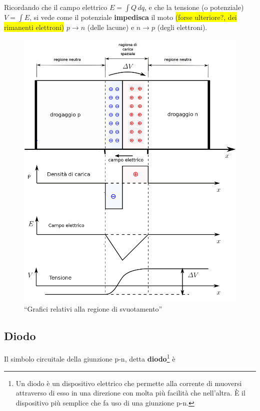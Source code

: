 \documentclass[
]{book}
\begin{document}
Ricordando che il campo elettrico \(E=\int Q \,dq\), e che la tensione
(o potenziale) \(V=\int E\), si vede come il potenziale
\textbf{impedisca} il moto \colorbox{yellow}{(forse ulteriore?,
dei rimanenti elettroni)} \(p\rightarrow n\) (delle lacune) e
\(n\rightarrow p\) (degli elettroni).

\begin{figure}
\centering
\includegraphics[width=\linewidth,height=0.35\textheight,keepaspectratio]{immagini/2.png}
\caption{``Grafici relativi alla regione di svuotamento''}
\end{figure}

\subsection{Diodo}\label{diodo}

Il simbolo circuitale della giunzione p-n, detta
\textbf{diodo}\footnote{Un diodo è un dispositivo elettrico che permette
  alla corrente di muoversi attraverso di esso in una direzione con
  molta più facilità che nell'altra. È il dispositivo più semplice che
  fa uso di una giunzione p-n.} è
\end{document}
